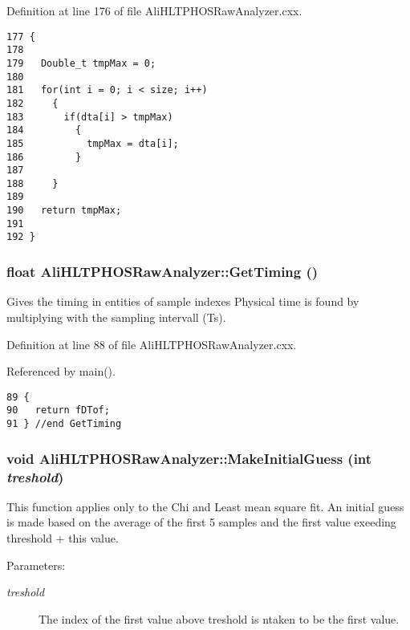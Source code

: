 Definition at line 176 of file Ali\-HLTPHOSRaw\-Analyzer.cxx.

\footnotesize\begin{verbatim}177 {
178 
179   Double_t tmpMax = 0;
180 
181   for(int i = 0; i < size; i++)
182     {
183       if(dta[i] > tmpMax)
184         {
185           tmpMax = dta[i];
186         }
187 
188     }
189   
190   return tmpMax;
191 
192 }
\end{verbatim}\normalsize 


\subsubsection{\setlength{\rightskip}{0pt plus 5cm}float Ali\-HLTPHOSRaw\-Analyzer::Get\-Timing ()\hspace{0.3cm}{\tt  [inherited]}}\label{classAliHLTPHOSRawAnalyzer_AliHLTPHOSRawAnalyzerPeakFindera10}


Gives the timing in entities of sample indexes Physical time is found by multiplying with the sampling intervall (Ts). 

Definition at line 88 of file Ali\-HLTPHOSRaw\-Analyzer.cxx.

Referenced by main().

\footnotesize\begin{verbatim}89 {
90   return fDTof;
91 } //end GetTiming
\end{verbatim}\normalsize 


\subsubsection{\setlength{\rightskip}{0pt plus 5cm}void Ali\-HLTPHOSRaw\-Analyzer::Make\-Initial\-Guess (int {\em treshold})\hspace{0.3cm}{\tt  [inherited]}}\label{classAliHLTPHOSRawAnalyzer_AliHLTPHOSRawAnalyzerPeakFindera16}


This function applies only to the Chi and Least mean square fit. An initial guess is made based on the average of the first 5 samples and the first value exeeding threshold + this value. \begin{Desc}
\item[Parameters:]
\begin{description}
\item[{\em treshold}]The index of the first value above treshold is ntaken to be the first value. \end{description}
\end{Desc}


